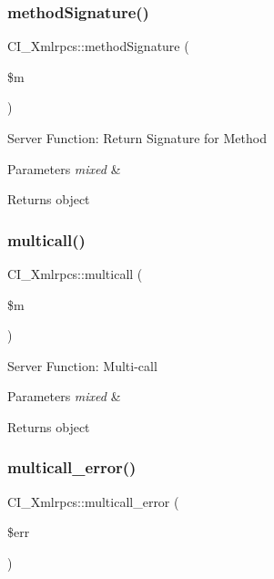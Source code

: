 \subsubsection{\texorpdfstring{method\+Signature()}{methodSignature()}}
{\footnotesize\ttfamily C\+I\+\_\+\+Xmlrpcs\+::method\+Signature (\begin{DoxyParamCaption}\item[{}]{\$m }\end{DoxyParamCaption})}

Server Function\+: Return Signature for Method


\begin{DoxyParams}{Parameters}
{\em mixed} & \\
\hline
\end{DoxyParams}
\begin{DoxyReturn}{Returns}
object 
\end{DoxyReturn}
\mbox{\label{class_c_i___xmlrpcs_a7bebfcaf8163990496e4ae88dbc64688}} 
\subsubsection{\texorpdfstring{multicall()}{multicall()}}
{\footnotesize\ttfamily C\+I\+\_\+\+Xmlrpcs\+::multicall (\begin{DoxyParamCaption}\item[{}]{\$m }\end{DoxyParamCaption})}

Server Function\+: Multi-\/call


\begin{DoxyParams}{Parameters}
{\em mixed} & \\
\hline
\end{DoxyParams}
\begin{DoxyReturn}{Returns}
object 
\end{DoxyReturn}
\mbox{\label{class_c_i___xmlrpcs_ac1cfc70f00dece7139d33623da533e13}} 
\subsubsection{\texorpdfstring{multicall\+\_\+error()}{multicall\_error()}}
{\footnotesize\ttfamily C\+I\+\_\+\+Xmlrpcs\+::multicall\+\_\+error (\begin{DoxyParamCaption}\item[{}]{\$err }\end{DoxyParamCaption})}

